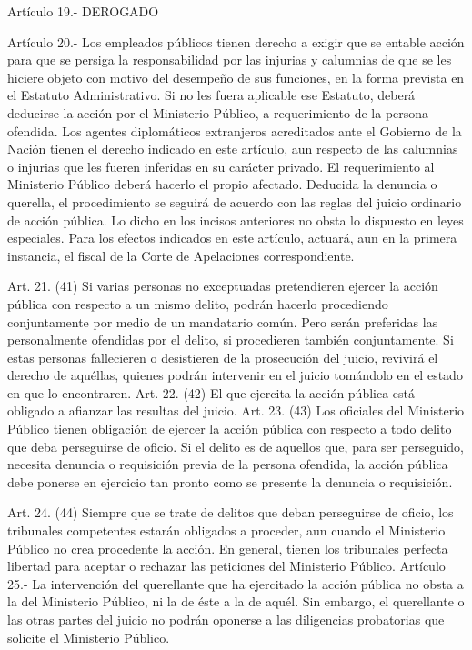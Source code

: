    Artículo 19.- DEROGADO

    Artículo 20.- Los empleados públicos tienen derecho a exigir que se entable acción para que se persiga la responsabilidad por las injurias y calumnias de que se les hiciere objeto con motivo del desempeño de sus funciones, en la forma prevista en el Estatuto Administrativo.
    Si no les fuera aplicable ese Estatuto, deberá deducirse la acción por el Ministerio Público, a requerimiento de la persona ofendida.
    Los agentes diplomáticos extranjeros acreditados ante el Gobierno de la Nación tienen el derecho indicado en este artículo, aun respecto de las calumnias o injurias que les fueren inferidas en su carácter privado. El requerimiento al Ministerio Público deberá hacerlo el propio afectado.
    Deducida la denuncia o querella, el procedimiento se seguirá de acuerdo con las reglas del juicio ordinario de acción pública.
    Lo dicho en los incisos anteriores no obsta lo dispuesto en leyes especiales.
    Para los efectos indicados en este artículo, actuará, aun en la primera instancia, el fiscal de la Corte de Apelaciones correspondiente.

    Art. 21. (41) Si varias personas no exceptuadas pretendieren ejercer la acción pública con respecto a un mismo delito, podrán hacerlo procediendo conjuntamente por medio de un mandatario común.
    Pero serán preferidas las personalmente ofendidas por el delito, si procedieren también conjuntamente. Si estas personas fallecieren o desistieren de la prosecución del juicio, revivirá el derecho de aquéllas, quienes podrán intervenir en el juicio tomándolo en el estado en que lo encontraren.
    Art. 22. (42) El que ejercita la acción pública está obligado a afianzar las resultas del juicio.
    Art. 23. (43) Los oficiales del Ministerio Público tienen obligación de ejercer la acción pública con respecto a todo delito que deba perseguirse de oficio. Si el delito es de aquellos que, para ser perseguido, necesita denuncia o requisición previa de la persona ofendida, la acción pública debe ponerse en ejercicio tan pronto como se presente la denuncia o requisición.

    Art. 24. (44) Siempre que se trate de delitos que deban perseguirse de oficio, los tribunales competentes estarán obligados a proceder, aun cuando el Ministerio Público no crea procedente la acción.
    En general, tienen los tribunales perfecta libertad para aceptar o rechazar las peticiones del Ministerio Público.
    Artículo 25.- La intervención del querellante que ha ejercitado la acción pública no obsta a la del Ministerio Público, ni la de éste a la de aquél. Sin embargo, el querellante o las otras partes del juicio no podrán oponerse a las diligencias probatorias que solicite el Ministerio Público.

